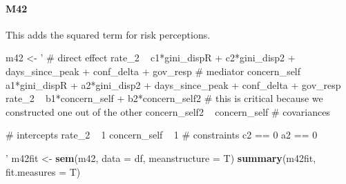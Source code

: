 \documentclass[
]{article}
\newenvironment{Shaded}{\begin{snugshade}}{\end{snugshade}}
\newcommand{\DataTypeTok}[1]{\textcolor[rgb]{0.13,0.29,0.53}{#1}}
\newcommand{\KeywordTok}[1]{\textcolor[rgb]{0.13,0.29,0.53}{\textbf{#1}}}
\newcommand{\NormalTok}[1]{#1}
\newcommand{\StringTok}[1]{\textcolor[rgb]{0.31,0.60,0.02}{#1}}
\begin{document}
\hypertarget{m42}{%
\paragraph{M42}\label{m42}}

This adds the squared term for risk perceptions.

\begin{Shaded}
\begin{Highlighting}[]
\NormalTok{m42 <-}\StringTok{ '   # direct effect}
\StringTok{             rate_2 ~ c1*gini_dispR + c2*gini_disp2 + days_since_peak + conf_delta + gov_resp }
\StringTok{           # mediator}
\StringTok{             concern_self ~ a1*gini_dispR + a2*gini_disp2 + days_since_peak + conf_delta + gov_resp }
\StringTok{             rate_2 ~ b1*concern_self + b2*concern_self2}
\StringTok{           # this is critical because we constructed one out of the other   }
\StringTok{             concern_self2 ~ concern_self}
\StringTok{           # covariances}

\StringTok{           # intercepts}
\StringTok{             rate_2 ~ 1}
\StringTok{             concern_self ~ 1}
\StringTok{           # constraints}
\StringTok{             c2 == 0}
\StringTok{             a2 == 0}

\StringTok{         '}
\NormalTok{m42fit <-}\StringTok{ }\KeywordTok{sem}\NormalTok{(m42, }\DataTypeTok{data =}\NormalTok{ df, }\DataTypeTok{meanstructure =}\NormalTok{ T)}
\KeywordTok{summary}\NormalTok{(m42fit, }\DataTypeTok{fit.measures =}\NormalTok{ T)}
\end{Highlighting}
\end{Shaded}
\end{document}
